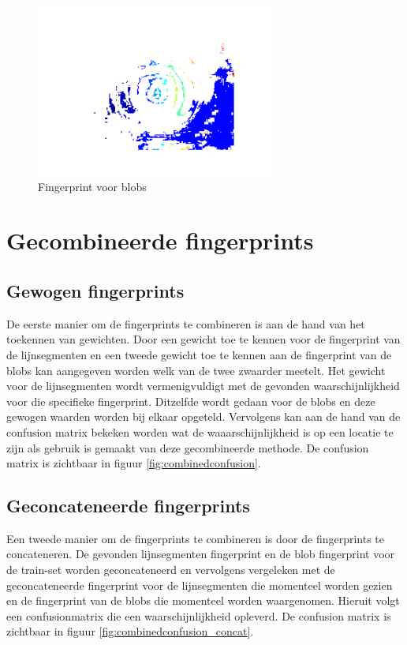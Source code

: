 \documentclass[a4paper]{article}
\begin{document}
\begin{figure}[h]
	\centering
	\includegraphics[width=0.7\textwidth]{fingerprintblob.png}
	\caption{Fingerprint voor blobs}
	\label{fig:blobfinger}
\end{figure}


\section{Gecombineerde fingerprints}
\subsection{Gewogen fingerprints}
De eerste manier om de fingerprints te combineren is aan de hand van het toekennen van gewichten. Door een gewicht toe te kennen voor de fingerprint van de lijnsegmenten en een tweede gewicht toe te kennen aan de fingerprint van de blobs kan aangegeven worden welk van de twee zwaarder meetelt. Het gewicht voor de lijnsegmenten wordt vermenigvuldigt met de gevonden waarschijnlijkheid voor die specifieke fingerprint. Ditzelfde wordt gedaan voor de blobs en deze gewogen waarden worden bij elkaar opgeteld. Vervolgens kan aan de hand van de confusion matrix bekeken worden wat de waaarschijnlijkheid is op een locatie te zijn als gebruik is gemaakt van deze gecombineerde methode. De confusion matrix is zichtbaar in figuur \ref{fig:combinedconfusion}.

\subsection{Geconcateneerde fingerprints}
Een tweede manier om de fingerprints te combineren is door de fingerprints te concateneren. De gevonden lijnsegmenten fingerprint en de blob fingerprint voor de train-set worden geconcateneerd en vervolgens vergeleken met de geconcateneerde fingerprint voor de lijnsegmenten die momenteel worden gezien en de fingerprint van de blobs die momenteel worden waargenomen. Hieruit volgt een confusionmatrix die een waarschijnlijkheid opleverd. De confusion matrix is zichtbaar in figuur \ref{fig:combinedconfusion_concat}.
\end{document}
